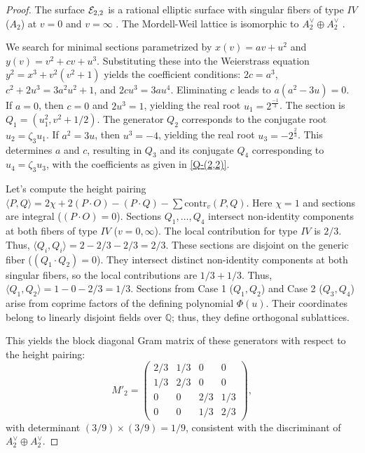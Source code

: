 \documentclass[11pt]{amsart}
\begin{document}
\begin{proof}
	The surface ${\mathcal E}_{2,2}$ is a rational elliptic surface with singular fibers of type $IV$ ($A_2$) at $v=0$ and $v=\infty$ \cite[Sect. 5.8]{Schuett2019}. The Mordell-Weil lattice is isomorphic to $A_2^\vee \oplus A_2^\vee$ \cite[Table 8.2, No. 11]{Schuett2019}.
	
	We search for minimal sections parametrized by $x(v)=av+u^2$ and $y(v)=v^2+cv+u^3$. Substituting these into the Weierstrass equation $y^2 = x^3 + v^2(v^2+1)$ yields the coefficient conditions: $2c = a^3$, $c^2+2u^3 = 3a^2u^2+1$, and $2cu^3 = 3au^4$.
	Eliminating $c$ leads to $a(a^2-3u)=0$.
If $a=0$, then  $c=0$ and $2u^3=1$, yielding the real root $u_1 = 2^{\frac{-1}{3}}$. 
The section is $Q_1 = (u_1^2, v^2 + 1/2)$. The generator $Q_2$ corresponds to the conjugate root $u_2 = \zeta_3 u_1$.
If $a^2=3u$, then  $u^3 = -4$, yielding the real root $u_3 = -2^{\frac{2}{3}} $. This determines $a$ and $c$, resulting in $Q_3$ and its conjugate $Q_4$ corresponding to $u_4 =\zeta_3 u_3$, with the coefficients as given in \ref{Q-(2,2)}.
	
	Let's compute the height pairing $\langle P, Q \rangle = 2\chi + 2(P \cdot O) - (P \cdot Q) - \sum \text{contr}_v(P, Q)$. 
	Here $\chi=1$ and sections are integral ($(P \cdot O)=0$).
  Sections $Q_1, \dots, Q_4$ intersect non-identity components at both fibers of type $IV$ ($v=0, \infty$). The local contribution for type $IV$ is $2/3$. Thus, $\langle Q_i, Q_i \rangle = 2 - 2/3 - 2/3 = 2/3$.
   These sections are disjoint on the generic fiber ($(Q_1 \cdot Q_2)=0$). They intersect distinct non-identity components at both singular fibers, so the local contributions are $1/3 + 1/3$. Thus, $\langle Q_1, Q_2 \rangle = 1 - 0 - 2/3 = 1/3$.
  Sections from Case 1 ($Q_1, Q_2$) and Case 2 ($Q_3, Q_4$) arise from coprime factors of the defining polynomial $\Phi(u)$. Their coordinates belong to linearly disjoint fields over $\mathbb{Q}$; thus, they define orthogonal sublattices.
 
	This yields the block diagonal Gram matrix    of these generators with respect to the height pairing:
	\[
	M'_2 = \begin{pmatrix}
		2/3 & 1/3 & 0 & 0 \\
		1/3 & 2/3 & 0 & 0 \\
		0 & 0 & 2/3 & 1/3 \\
		0 & 0 & 1/3 & 2/3
	\end{pmatrix},
	\]	
	 with determinant $(3/9) \times (3/9) = 1/9$, consistent with the discriminant of $A_2^\vee \oplus A_2^\vee$.
\end{proof}
\end{document}
